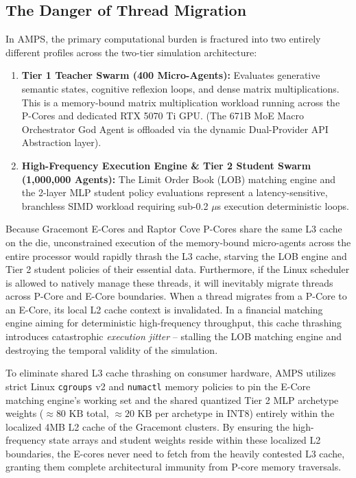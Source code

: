 \subsection{The Danger of Thread Migration}

In AMPS, the primary computational burden is fractured into two entirely different profiles across the two-tier simulation architecture:
\begin{enumerate}
    \item \textbf{Tier 1 Teacher Swarm (400 Micro-Agents):} Evaluates generative semantic states, cognitive reflexion loops, and dense matrix multiplications. This is a memory-bound matrix multiplication workload running across the P-Cores and dedicated RTX 5070 Ti GPU. (The 671B MoE Macro Orchestrator God Agent is offloaded via the dynamic Dual-Provider API Abstraction layer).
    \item \textbf{High-Frequency Execution Engine \& Tier 2 Student Swarm (1,000,000 Agents):} The Limit Order Book (LOB) matching engine and the 2-layer MLP student policy evaluations represent a latency-sensitive, branchless SIMD workload requiring sub-0.2 $\mu$s execution deterministic loops.
\end{enumerate}

Because Gracemont E-Cores and Raptor Cove P-Cores share the same L3 cache on the die, unconstrained execution of the memory-bound micro-agents across the entire processor would rapidly thrash the L3 cache, starving the LOB engine and Tier 2 student policies of their essential data. Furthermore, if the Linux scheduler is allowed to natively manage these threads, it will inevitably migrate threads across P-Core and E-Core boundaries. When a thread migrates from a P-Core to an E-Core, its local L2 cache context is invalidated. In a financial matching engine aiming for deterministic high-frequency throughput, this cache thrashing introduces catastrophic \textit{execution jitter} -- stalling the LOB matching engine and destroying the temporal validity of the simulation.

To eliminate shared L3 cache thrashing on consumer hardware, AMPS utilizes strict Linux \texttt{cgroups} v2 \cite{corbet2019cgroups} and \texttt{numactl} memory policies to pin the E-Core matching engine's working set and the shared quantized Tier 2 MLP archetype weights ($\approx 80\text{ KB}$ total, $\approx 20\text{ KB}$ per archetype in INT8) entirely within the localized 4MB L2 cache of the Gracemont clusters. By ensuring the high-frequency state arrays and student weights reside within these localized L2 boundaries, the E-cores never need to fetch from the heavily contested L3 cache, granting them complete architectural immunity from P-core memory traversals.

